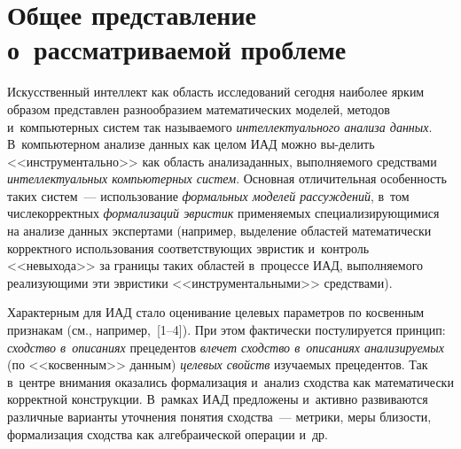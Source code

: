 

\vspace*{-4pt}



\thispagestyle{headings}

\begin{multicols}{2}

\label{st\stat}

\section{Общее представление о~рассматриваемой проблеме}

\vspace*{-5pt}

    Искусственный интеллект как область исследований сегодня наиболее 
ярким образом представлен разнообразием математических моделей, 
методов и~компьютерных систем так называемого \textit{интеллектуального 
анализа данных}. В~компьютерном анализе данных как целом ИАД 
можно вы-\linebreak делить <<инструментально>> как область анализа\linebreak данных, 
выполняемого средствами \textit{интеллектуальных компьютерных систем}. 
Основная отличительная особенность таких систем~--- использование 
\textit{формальных моделей рассуждений}, в~том числе\linebreak корректных 
\textit{формализаций эвристик} применяемых специализирующимися на 
анализе данных экспертами (например, выделение областей математически 
корректного использования соответствующих эвристик и~контроль 
<<невыхода>> за границы таких областей в~процессе ИАД, выполняемого 
реализующими эти эвристики <<инструментальными>> средствами).
    
    Характерным для ИАД стало оценивание целевых параметров по 
косвенным признакам (см., например,~[1--4]). При этом фактически постулируется 
принцип: \textit{сходство в~описаниях} прецедентов \textit{влечет сходство 
в~описаниях анализируемых} (по <<косвенным>> данным) \textit{целевых 
свойств} изучаемых прецедентов. Так в~центре внимания оказались 
формализация и~анализ сходства как математически корректной 
конструкции. В~рамках ИАД предложены и~активно развиваются различные 
варианты уточнения понятия сходства~--- метрики, меры близости, 
формализация сходства как алгебраической операции и~др.
    

\end{multicols}
